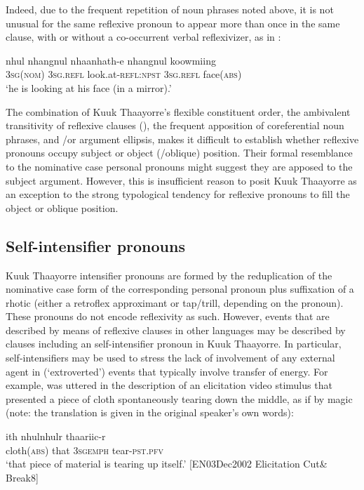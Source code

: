 \documentclass[output=paper]{langscibook}
\begin{document}
Indeed, due to the frequent repetition of noun phrases noted above, it is not unusual for the same reflexive pronoun to appear more than once in the same clause, with or without a co-occurrent verbal reflexivizer, as in :

\ea 
    \label{ex:Gaby:3}
    \gll nhul nhangnul nhaanhath-e nhangnul koowmiing\\
    3\textsc{sg}(\textsc{nom}) 3\textsc{sg}.\textsc{refl}  look.at-\textsc{refl:npst}  3\textsc{sg}.\textsc{refl} face(\textsc{abs})\\
    \glt ‘he is looking at his face (in a mirror).’ \citep[379]{Hall1972}
   \z
  
The combination of Kuuk Thaayorre’s flexible constituent order, the ambivalent transitivity of reflexive clauses (), the frequent apposition of coreferential noun phrases, and /or argument ellipsis, makes it difficult to establish whether reflexive pronouns occupy subject or object (/oblique) position. Their formal resemblance to the nominative case personal pronouns might suggest they are apposed to the subject argument. However, this is insufficient reason to posit Kuuk Thaayorre as an exception to the strong typological tendency for reflexive pronouns to fill the object or oblique position.

\subsection{Self-intensifier pronouns}\label{sec:Gaby:2.3}
Kuuk Thaayorre intensifier pronouns are formed by the reduplication of the nominative case form of the corresponding personal pronoun plus suffixation of a rhotic (either a retroflex approximant or tap/trill, depending on the pronoun). These pronouns do not encode reflexivity as such. However, events that are described by means of reflexive clauses in other languages may be described by clauses including an self-intensifier pronoun in Kuuk Thaayorre. In particular, self-intensifiers may be used to stress the lack of involvement of any external agent in (‘extroverted’) events that typically involve transfer of energy. For example,  was uttered in the description of an elicitation video stimulus that presented a piece of cloth spontaneously tearing down the middle, as if by magic (note: the translation is given in the original speaker’s own words):

 

\ea 
    \label{ex:Gaby:4}
      {ith}  {nhulnhulr}  {thaariic-r}\\
    cloth(\textsc{abs})  that  3\textsc{sg}\textsc{emph}  tear-\textsc{pst.pfv}\\
    \glt  ‘that piece of material is tearing up itself.’ [EN03Dec2002 Elicitation Cut\& Break8]
    \z
\end{document}

